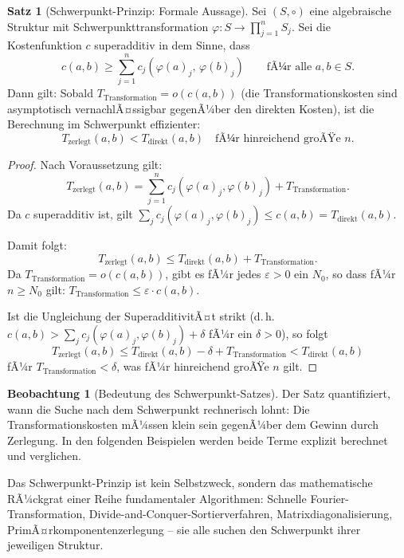 ﻿\documentclass[a4paper,12pt]{report}
\theoremstyle{definition}
\newtheorem{satz}{Satz}
\newtheorem{beobachtung}{Beobachtung}
\begin{document}
\begin{satz}[Schwerpunkt-Prinzip: Formale Aussage]
    \label{satz:schwerpunkt}
    Sei $(S, \circ)$ eine algebraische Struktur mit Schwerpunkttransformation
    $\varphi : S \to \prod_{j=1}^n S_j$.
    Sei die Kostenfunktion $c$ superadditiv in dem Sinne, dass
    \[
        c(a, b) \geq \sum_{j=1}^n c_j(\varphi(a)_j,\, \varphi(b)_j)
        \qquad \text{fÃ¼r alle } a, b \in S.
    \]
    Dann gilt: Sobald $T_{\mathrm{Transformation}} = o(c(a,b))$
    (die Transformationskosten sind asymptotisch vernachlÃ¤ssigbar
    gegenÃ¼ber den direkten Kosten), ist die Berechnung im
    Schwerpunkt effizienter:
    \[
        T_{\mathrm{zerlegt}}(a, b) < T_{\mathrm{direkt}}(a, b)
        \quad \text{fÃ¼r hinreichend groÃŸe } n.
    \]
\end{satz}

\begin{proof}
    Nach Voraussetzung gilt:
    \[
        T_{\mathrm{zerlegt}}(a,b)
        = \sum_{j=1}^n c_j(\varphi(a)_j, \varphi(b)_j)
        + T_{\mathrm{Transformation}}.
    \]
    Da $c$ superadditiv ist, gilt
    $\sum_{j} c_j(\varphi(a)_j, \varphi(b)_j) \leq c(a,b)
    = T_{\mathrm{direkt}}(a,b)$.

    Damit folgt:
    \[
        T_{\mathrm{zerlegt}}(a,b)
        \leq T_{\mathrm{direkt}}(a,b) + T_{\mathrm{Transformation}}.
    \]
    Da $T_{\mathrm{Transformation}} = o(c(a,b))$, gibt es fÃ¼r jedes
    $\varepsilon > 0$ ein $N_0$, so dass fÃ¼r $n \geq N_0$ gilt:
    $T_{\mathrm{Transformation}} \leq \varepsilon \cdot c(a,b)$.

    Ist die Ungleichung der SuperadditivitÃ¤t strikt
    (d.\,h.\ $c(a,b) > \sum_j c_j(\varphi(a)_j, \varphi(b)_j) + \delta$
    fÃ¼r ein $\delta > 0$), so folgt
    \[
        T_{\mathrm{zerlegt}}(a,b)
        \leq T_{\mathrm{direkt}}(a,b) - \delta
        + T_{\mathrm{Transformation}}
        < T_{\mathrm{direkt}}(a,b)
    \]
    fÃ¼r $T_{\mathrm{Transformation}} < \delta$,
    was fÃ¼r hinreichend groÃŸe $n$ gilt.
\end{proof}

\begin{beobachtung}[Bedeutung des Schwerpunkt-Satzes]
    Der Satz quantifiziert, wann die Suche nach dem Schwerpunkt
    rechnerisch lohnt: Die Transformationskosten mÃ¼ssen klein sein
    gegenÃ¼ber dem Gewinn durch Zerlegung. In den folgenden Beispielen
    werden beide Terme explizit berechnet und verglichen.

    Das Schwerpunkt-Prinzip ist kein Selbstzweck, sondern das
    mathematische RÃ¼ckgrat einer Reihe fundamentaler Algorithmen:
    Schnelle Fourier-Transformation, Divide-and-Conquer-Sortierverfahren,
    Matrixdiagonalisierung, PrimÃ¤rkomponentenzerlegung -- sie alle
    suchen den Schwerpunkt ihrer jeweiligen Struktur.
\end{beobachtung}
\end{document}
